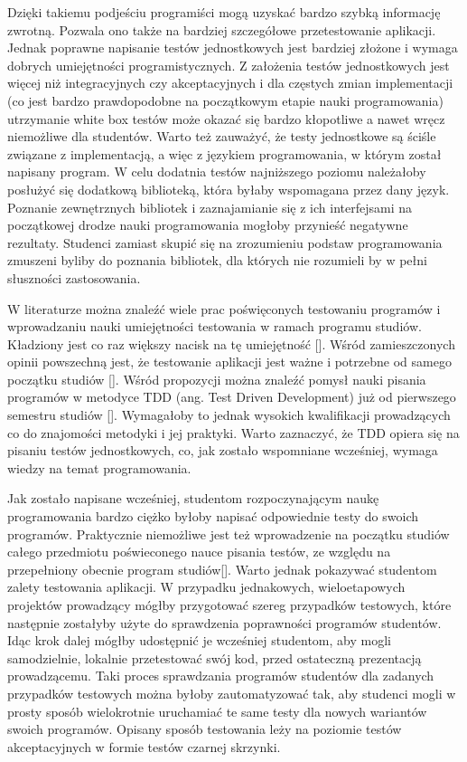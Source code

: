 Dzięki takiemu podjeściu programiści mogą uzyskać bardzo szybką informację zwrotną.
Pozwala ono także na bardziej szczegółowe przetestowanie aplikacji.
Jednak poprawne napisanie testów jednostkowych jest bardziej złożone i wymaga dobrych umiejętności programistycznych.
Z założenia testów jednostkowych jest więcej niż integracyjnych czy akceptacyjnych i dla częstych zmian implementacji (co jest bardzo prawdopodobne na początkowym etapie nauki programowania) utrzymanie white box testów może okazać się bardzo kłopotliwe a nawet wręcz niemożliwe dla studentów.
Warto też zauważyć, że testy jednostkowe są ściśle związane z implementacją, a więc z językiem programowania, w którym został napisany program.
W celu dodatnia testów najniższego poziomu należałoby posłużyć się dodatkową biblioteką, która byłaby wspomagana przez dany język.
Poznanie zewnętrznych bibliotek i zaznajamianie się z ich interfejsami na początkowej drodze nauki programowania mogłoby przynieść negatywne rezultaty.
Studenci zamiast skupić się na zrozumieniu podstaw programowania zmuszeni byliby do poznania bibliotek, dla których nie rozumieli by w pełni słuszności zastosowania.

W literaturze można znaleźć wiele prac poświęconych testowaniu programów i wprowadzaniu nauki umiejętności testowania w ramach programu studiów.
Kładziony jest co raz większy nacisk na tę umiejętność [].
Wśród zamieszczonych opinii powszechną jest, że testowanie aplikacji jest ważne i potrzebne od samego początku studiów [].
Wśród propozycji można znaleźć pomysł nauki pisania programów w metodyce TDD (ang. Test Driven Development) już od pierwszego semestru studiów [].
Wymagałoby to jednak wysokich kwalifikacji prowadzących co do znajomości metodyki i jej praktyki.
Warto zaznaczyć, że TDD opiera się na pisaniu testów jednostkowych, co, jak zostało wspomniane wcześniej, wymaga wiedzy na temat programowania.

Jak zostało napisane wcześniej, studentom rozpoczynającym naukę programowania bardzo ciężko byłoby napisać odpowiednie testy do swoich programów.
Praktycznie niemożliwe jest też wprowadzenie na początku studiów całego przedmiotu poświeconego nauce pisania testów, ze względu na przepełniony obecnie program studiów[].
Warto jednak pokazywać studentom zalety testowania aplikacji.
W przypadku jednakowych, wieloetapowych projektów prowadzący mógłby przygotować szereg przypadków testowych, które następnie zostałyby użyte do sprawdzenia poprawności programów studentów.
Idąc krok dalej mógłby udostępnić je wcześniej studentom, aby mogli samodzielnie, lokalnie przetestować swój kod, przed ostateczną prezentacją prowadzącemu.
Taki proces sprawdzania programów studentów dla zadanych przypadków testowych można byłoby zautomatyzować tak, aby studenci mogli w prosty sposób wielokrotnie uruchamiać te same testy dla nowych wariantów swoich programów.
Opisany sposób testowania leży na poziomie testów akceptacyjnych w formie testów czarnej skrzynki.

